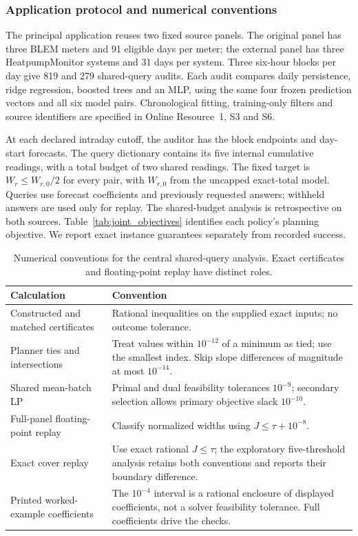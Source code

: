 \documentclass[12pt]{article}
\begin{document}
\subsubsection{Application protocol and numerical conventions}
\label{sec:joint-protocol-summary}
The principal application reuses two fixed source panels. The original
panel has three BLEM meters and 91 eligible days per meter; the external
panel has three HeatpumpMonitor systems and 31 days per system. Three
six-hour blocks per day give 819 and 279 shared-query audits. Each audit
compares daily persistence, ridge regression, boosted trees and an MLP,
using the same four frozen prediction vectors and all six model pairs.
Chronological fitting, training-only filters and source identifiers are
specified in Online Resource~1, S3 and S6.

At each declared intraday cutoff, the auditor has the block endpoints and
day-start forecasts. The query dictionary contains its five internal
cumulative readings, with a total budget of two shared readings.
The fixed target is $W_r\leq W_{r,0}/2$ for every pair, with $W_{r,0}$ from
the uncapped exact-total model. Queries use forecast coefficients and
previously requested answers; withheld answers are used only for replay.
The shared-budget analysis is retrospective on both sources.
Table~\ref{tab:joint_objectives} identifies each policy's planning objective.
We report exact instance guarantees separately from recorded success.

\begin{table}[htbp]\centering\small
\caption{Numerical conventions for the central shared-query analysis.
Exact certificates and floating-point replay have distinct roles.}
\label{tab:numerical-conventions}
\begin{tabular}{@{}>{\raggedright\arraybackslash}p{.27\linewidth}>{\raggedright\arraybackslash}p{.66\linewidth}@{}}
\toprule
Calculation & Convention\\\midrule
Constructed and matched certificates &
Rational inequalities on the supplied exact inputs; no outcome tolerance.\\
Planner ties and intersections &
Treat values within $10^{-12}$ of a minimum as tied; use the smallest index.
Skip slope differences of magnitude at most $10^{-14}$.\\
Shared mean-batch LP &
Primal and dual feasibility tolerances $10^{-9}$; secondary selection
allows primary objective slack $10^{-10}$.\\
Full-panel floating-point replay &
Classify normalized widths using $J\leq\tau+10^{-8}$.\\
Exact cover replay &
Use exact rational $J\leq\tau$; the exploratory five-threshold analysis
retains both conventions and reports their boundary difference.\\
Printed worked-example coefficients &
The $10^{-4}$ interval is a rational enclosure of displayed coefficients,
not a solver feasibility tolerance. Full coefficients drive the checks.\\
\bottomrule\end{tabular}\end{table}
\end{document}
